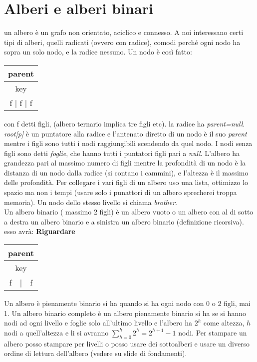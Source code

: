 \documentclass[a4paper,12pt,oneside,tikz]{book}
\begin{document}
\section{Alberi e alberi binari}
un albero è un grafo non orientato, aciclico e connesso. A noi interessano certi tipi di alberi, quelli radicati (ovvero con radice), comodi perché ogni nodo ha sopra un solo nodo, e la radice nessuno.
Un nodo è così fatto:
\begin{center}
\begin{tabular}{|c|}
\hline
parent\\
\hline
key\\
\hline
f$\,\,|\,\,$f$\,\,|\,\,$f\\
\hline
\end{tabular}
\end{center}
con f detti figli, (albero ternario implica tre figli etc). la radice ha \textit{parent=null}. \textit{root[p]} è un puntatore alla radice e l'antenato diretto di un nodo è il suo \textit{parent} mentre i figli sono tutti i nodi raggiungibili scendendo da quel nodo. I nodi senza figli sono detti \textit{foglie}, che hanno tutti i puntatori figli pari a \textit{null}. L'albero ha grandezza pari al massimo numero di figli mentre la profondità di un nodo è la distanza di un nodo dalla radice (si contano i cammini), e l'altezza è il massimo delle profondità. Per collegare i vari figli di un albero uso una lista, ottimizzo lo spazio ma non i tempi (usare solo i punattori di un albero sprecherei troppa memoria). Un nodo dello stesso livello si chiama \textit{brother}.\\
Un albero binario ( massimo 2 figli) è un albero vuoto o un albero con al di sotto a destra un albero binario e a sinistra un albero binario (definizione ricorsiva).
esso avrà:
\textbf{Riguardare}
\begin{center}
\begin{tabular}{|c|}
\hline
parent\\
\hline
key\\
\hline
f$\,\,\,\,\,\,|\,\,\,\,\,\,$f\\
\hline
\end{tabular}
\end{center}
Un albero è pienamente binario si ha quando si ha ogni nodo con 0 o 2 figli, mai 1. Un albero binario completo è un albero pienamente binario si ha se si hanno nodi ad ogni livello e foglie solo all'ultimo livello e l'albero ha $2^h$ come altezza, $h$ nodi a quell'altezza e li si avranno $\sum _{h=0}^h 2^h=2^{h+1}-1$ nodi.  Per stampare un albero posso stampare per livelli o posso usare dei sottoalberi e usare un diverso ordine di lettura dell'albero (vedere su slide di fondamenti).
\end{document}
